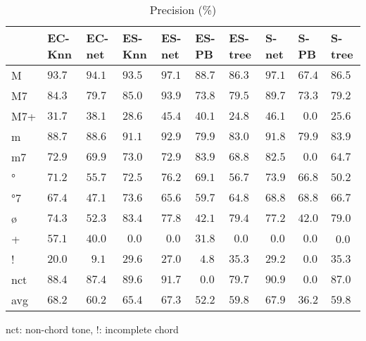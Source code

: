 \documentclass{article}
\begin{document}
\begin{table}
  \centering
  \begin{tabular}{l|p{.5cm}p{.5cm}p{.5cm}p{.5cm}p{.5cm}p{.5cm}p{.5cm}p{.5cm}p{.5cm}}
   & EC-Knn&EC-net&ES-Knn&ES-net&ES-PB&ES-tree&S-net &S-PB &S-tree \\
\hline                                               
M  &$ 93.7  $&$94.1  $&$93.5  $&$97.1  $&$88.7 $&$86.3   $&$97.1  $&$ 67.4$&$86.5$   \\
M7 &$ 84.3  $&$79.7  $&$85.0  $&$93.9  $&$73.8 $&$79.5   $&$89.7  $&$ 73.3$&$79.2$   \\
M7+&$ 31.7  $&$38.1  $&$28.6  $&$45.4  $&$40.1 $&$24.8   $&$46.1  $&$~~0.0$&$25.6$   \\
m  &$ 88.7  $&$88.6  $&$91.1  $&$92.9  $&$79.9 $&$83.0   $&$91.8  $&$ 79.9$&$83.9$   \\
m7 &$ 72.9  $&$69.9  $&$73.0  $&$72.9  $&$83.9 $&$68.8   $&$82.5  $&$~~0.0$&$64.7$   \\
°  &$ 71.2  $&$55.7  $&$72.5  $&$76.2  $&$69.1 $&$56.7   $&$73.9  $&$ 66.8$&$50.2$   \\
°7 &$ 67.4  $&$47.1  $&$73.6  $&$65.6  $&$59.7 $&$64.8   $&$68.8  $&$ 68.8$&$66.7$   \\
ø  &$ 74.3  $&$52.3  $&$83.4  $&$77.8  $&$42.1 $&$79.4   $&$77.2  $&$ 42.0$&$79.0$   \\
+  &$ 57.1  $&$40.0  $&$~~0.0 $&$~~0.0 $&$31.8 $&$~~0.0  $&$~~0.0 $&$~~0.0$&$~~0.$0  \\
!  &$ 20.0  $&$~~9.1 $&$29.6  $&$27.0  $&$~~4.8$&$35.3   $&$29.2  $&$~~0.0$&$35.3$   \\
nct&$ 88.4  $&$87.4  $&$89.6  $&$91.7  $&$~~0.0$&$79.7   $&$90.9  $&$~~0.0$&$87.0$   \\
avg&$ 68.2  $&$60.2  $&$65.4  $&$67.3  $&$52.2 $&$59.8   $&$67.9  $&$36.2$&$59.8 $  \\

  \end{tabular}

\medskip

nct: non-chord tone, !: incomplete chord

  \caption{Precision (\%)}
  \label{tab:precision}
\end{table}
\end{document}
